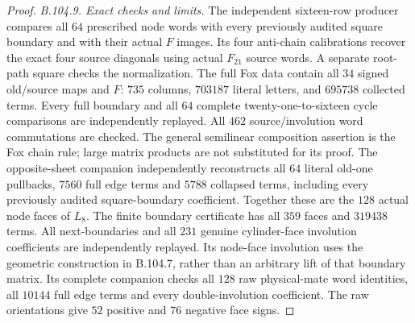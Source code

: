 \begin{proof}
\emph{B.104.9. Exact checks and limits.}
The independent sixteen-row producer compares all $64$ prescribed
node words with every previously audited square boundary and
with their actual $F$ images. Its four anti-chain calibrations
recover the exact four source diagonals using actual $F_{21}$
source words. A separate root-path square checks the normalization.
The full Fox data contain all $34$ signed old/source maps and
$F$: $735$ columns, $703187$ literal letters, and $695738$
collected terms. Every full boundary and all $64$ complete
twenty-one-to-sixteen cycle comparisons are independently replayed.
All $462$ source/involution word commutations are checked. The
general semilinear composition assertion is the Fox chain rule;
large matrix products are not substituted for its proof.
The opposite-sheet companion independently reconstructs all $64$
literal old-one pullbacks, $7560$ full edge terms and $5788$
collapsed terms, including every previously audited square-boundary
coefficient. Together these are the $128$ actual node faces of $L_8$.
The finite boundary certificate has all $359$ faces and $319438$
terms. All next-boundaries and all $231$ genuine cylinder-face
involution coefficients are independently replayed. Its node-face
involution uses the geometric construction in B.104.7, rather than
an arbitrary lift of that boundary matrix. Its complete companion
checks all $128$ raw physical-mate word identities, all $10144$
full edge terms and every double-involution coefficient. The raw
orientations give $52$ positive and $76$ negative face signs.


\end{proof}
